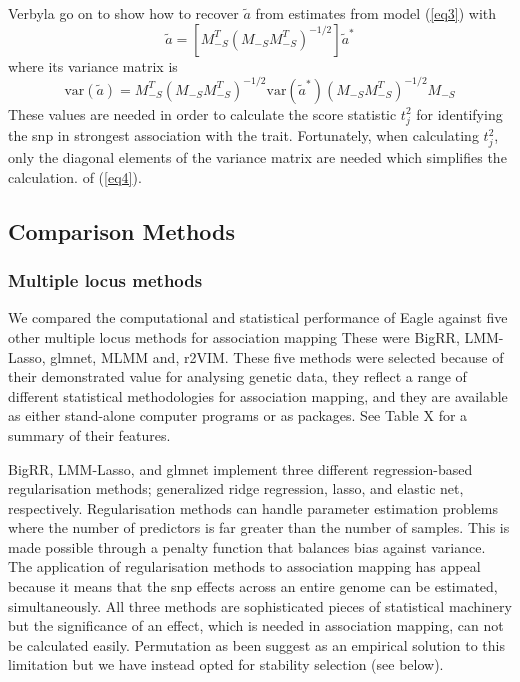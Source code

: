 \documentclass{nature}
\begin{document}
Verbyla \cite{verbyla2012rwgaim,verbyla2014whole} go on to show how to recover $\widetilde{a}$ from estimates from model  (\ref{eq3})  with 
\begin{equation}
\widetilde{a} = \left [ M_{-S}^T (M_{-S} M_{-S}^T)^{-1/2} \right ] \widetilde{a}^*
\end{equation}
where its variance matrix is
\begin{equation}
\label{eq4}
\textrm{var}(\widetilde{a}) = M_{-S}^T (M_{-S} M_{-S}^T)^{-1/2} \textrm{var}(\widetilde{a}^*) (M_{-S} M_{-S}^T)^{-1/2} M_{-S}
\end{equation}
These values are needed in order to calculate the score statistic $t_j^2$ for identifying the snp in strongest association with the trait. 
Fortunately, when calculating $t_j^2$, only the diagonal elements of the variance matrix are needed which simplifies the  calculation. 
of (\ref{eq4}). 



\subsection{Comparison Methods}

\subsubsection{Multiple locus methods}

We compared the computational and statistical performance of Eagle against five other multiple locus methods for 
association mapping  These were BigRR, LMM-Lasso, glmnet, MLMM  and, r2VIM. 
These five methods were selected because of their demonstrated value 
for analysing genetic data, they reflect a range of different statistical methodologies for association mapping, and they are available as 
either stand-alone computer programs or as  packages. See Table X for a summary of their features. 

BigRR, LMM-Lasso, and glmnet  implement three different regression-based regularisation methods; generalized ridge regression, 
lasso, and elastic net, respectively. Regularisation methods can handle parameter estimation problems where the number of predictors is
 far greater than the number of  samples. This is made possible through a penalty function that balances bias against variance. 
The application of regularisation methods to association mapping has appeal because it means that the snp effects across an 
entire genome can be estimated, simultaneously. 
All three methods are sophisticated pieces of statistical machinery but the significance of an effect, which 
is needed in association mapping,  can not be calculated easily. Permutation as been suggest as an empirical solution to this 
limitation \cite{shen2013novel} 
but we have instead opted for stability selection (see below).
\end{document}
